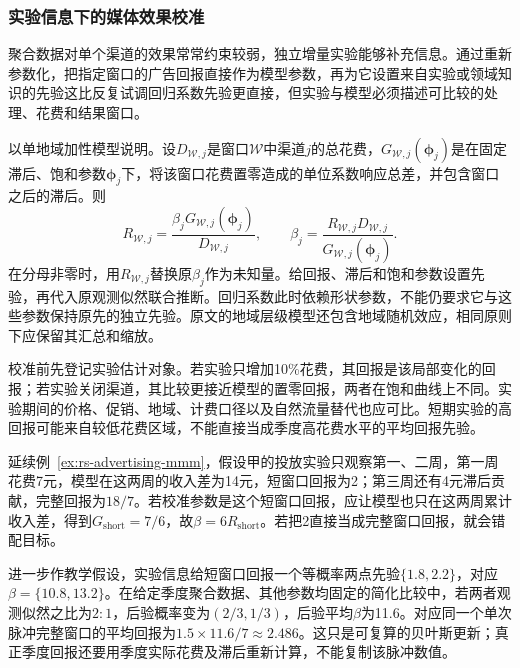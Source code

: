 \Needspace{80mm}
\subsubsection{实验信息下的媒体效果校准}
\label{sec:rs-advertising-mmm-calibration}

聚合数据对单个渠道的效果常常约束较弱，独立增量实验能够补充信息。通过重新参数化，把指定窗口的广告回报直接作为模型参数，再为它设置来自实验或领域知识的先验这比反复试调回归系数先验更直接，但实验与模型必须描述可比较的处理、花费和结果窗口。

以单地域加性模型说明。设$D_{\mathcal W,j}$是窗口$\mathcal W$中渠道$j$的总花费，$G_{\mathcal W,j}(\bm\phi_j)$是在固定滞后、饱和参数$\bm\phi_j$下，将该窗口花费置零造成的单位系数响应总差，并包含窗口之后的滞后。则
\begin{equation}
  R_{\mathcal W,j}
    =\frac{\beta_jG_{\mathcal W,j}(\bm\phi_j)}
           {D_{\mathcal W,j}},
  \qquad
  \beta_j
    =\frac{R_{\mathcal W,j}D_{\mathcal W,j}}
           {G_{\mathcal W,j}(\bm\phi_j)}.
  \label{eq:rs-advertising-mmm-reparameterization}
\end{equation}
在分母非零时，用$R_{\mathcal W,j}$替换原$\beta_j$作为未知量。给回报、滞后和饱和参数设置先验，再代入原观测似然联合推断。回归系数此时依赖形状参数，不能仍要求它与这些参数保持原先的独立先验。原文的地域层级模型还包含地域随机效应，相同原则下应保留其汇总和缩放。

校准前先登记实验估计对象。若实验只增加10\%花费，其回报是该局部变化的回报；若实验关闭渠道，其比较更接近模型的置零回报，两者在饱和曲线上不同。实验期间的价格、促销、地域、计费口径以及自然流量替代也应可比。短期实验的高回报可能来自较低花费区域，不能直接当成季度高花费水平的平均回报先验。

延续例~\ref{ex:rs-advertising-mmm}，假设甲的投放实验只观察第一、二周，第一周花费7元，模型在这两周的收入差为14元，短窗口回报为2；第三周还有4元滞后贡献，完整回报为$18/7$。若校准参数是这个短窗口回报，应让模型也只在这两周累计收入差，得到$G_{\mathrm{short}}=7/6$，故$\beta=6R_{\mathrm{short}}$。若把2直接当成完整窗口回报，就会错配目标。

进一步作教学假设，实验信息给短窗口回报一个等概率两点先验$\{1.8,2.2\}$，对应$\beta=\{10.8,13.2\}$。在给定季度聚合数据、其他参数均固定的简化比较中，若两者观测似然之比为$2:1$，后验概率变为$(2/3,1/3)$，后验平均$\beta$为11.6。对应同一个单次脉冲完整窗口的平均回报为$1.5\times11.6/7\approx2.486$。这只是可复算的贝叶斯更新；真正季度回报还要用季度实际花费及滞后重新计算，不能复制该脉冲数值。

